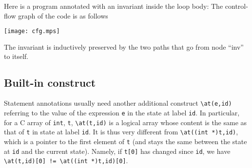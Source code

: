 \begin{example}
Here is a program annotated with an invariant inside the loop body:
The control-flow graph of the code is as follows
\begin{center}
\texttt{[image: cfg.mps]}
\end{center}
The invariant is inductively preserved by the two paths that go from
node ``inv'' to itself.
\end{example}

\begin{example}

\end{example}


\subsection{Built-in construct \texorpdfstring{\at}{\textbackslash{}at}}
\label{sec:at}
 Statement annotations usually need another additional
construct \lstinline|\at(e,id)| referring to the value of the
expression \lstinline|e| in the state at label \lstinline|id|. 
In particular, for a C array of \lstinline|int|, 
\lstinline|t|, \lstinline|\at(t,id)| is a logical
array whose content is the same as that of \lstinline|t| in state at label
\lstinline|id|. It is thus very different from 
\lstinline|\at((int *)t,id)|, which
is a pointer to the first element of \lstinline|t| (and stays the same between 
the state at \lstinline|id| and the current state). Namely, if 
\lstinline|t[0]| has changed since \lstinline|id|, we have
\lstinline|\at(t,id)[0] != \at((int *)t,id)[0]|.


